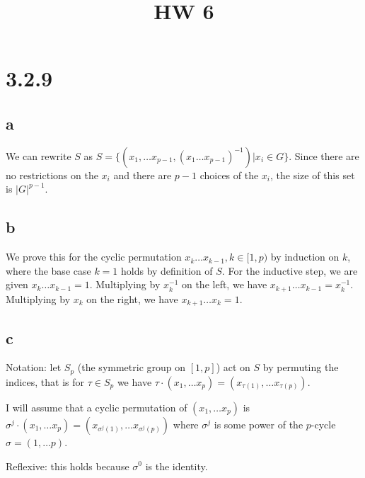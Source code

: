 \documentclass{article}
\title{HW 6}
\date{}
\def\inv{{-1}}
\begin{document}
\maketitle







\section*{3.2.9}

\subsection*{a}

We can rewrite $S$ as $S = \{(x_1, \ldots x_{p-1}, (x_1 \ldots x_{p-1})^\inv) | x_i \in G\}$. Since there are no restrictions on the $x_i$ and there are $p-1$ choices of the $x_i$, the size of this set is $|G|^{p-1}$.

\subsection*{b}

We prove this for the cyclic permutation $x_k \ldots x_{k-1}, k \in [1, p)$ by induction on $k$, where the base case $k=1$ holds by definition of $S$. For the inductive step, we are given $x_k \ldots x_{k-1} = 1$. Multiplying by $x_k^\inv$ on the left, we have $x_{k+1} \ldots x_{k-1} = x_k^\inv$. Multiplying by $x_k$ on the right, we have $x_{k+1} \ldots x_{k} = 1$.

\subsection*{c}

Notation: let $S_p$ (the symmetric group on $[1, p]$) act on $S$ by permuting the indices, that is for $\tau \in S_p$ we have $\tau \cdot (x_1, \ldots x_p) = (x_{\tau(1)}, \ldots x_{\tau(p)})$.

I will assume that a cyclic permutation of $(x_1, \ldots x_p)$ is $\sigma^j \cdot (x_1, \ldots x_p) = (x_{\sigma^j(1)}, \ldots x_{\sigma^j(p)})$ where $\sigma^j$ is some power of the $p$-cycle $\sigma = (1, \ldots p)$.


Reflexive: this holds because $\sigma^0$ is the identity.
\end{document}
